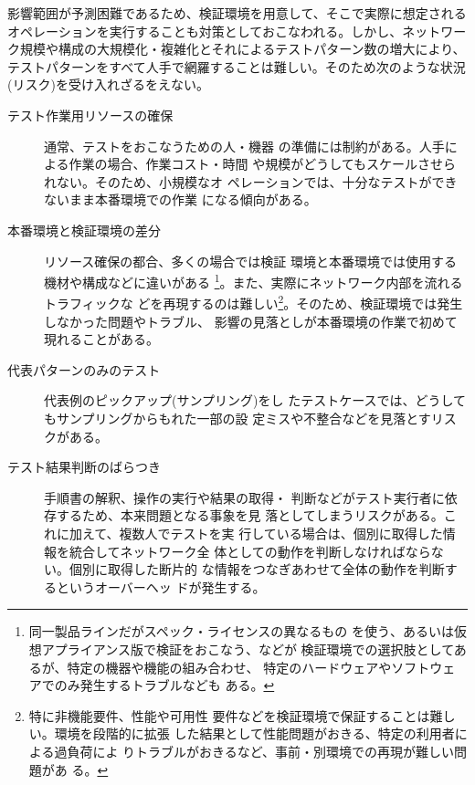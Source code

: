 影響範囲が予測困難であるため、検証環境を用意して、そこで実際に想定される
オペレーションを実行することも対策としておこなわれる。しかし、ネットワー
ク規模や構成の大規模化・複雑化とそれによるテストパターン数の増大により、
テストパターンをすべて人手で網羅することは難しい。そのため次のような状況
(リスク)を受け入れざるをえない。
\begin{description}
 \item[テスト作業用リソースの確保] 通常、テストをおこなうための人・機器
            の準備には制約がある。人手による作業の場合、作業コスト・時間
            や規模がどうしてもスケールさせられない。そのため、小規模なオ
            ペレーションでは、十分なテストができないまま本番環境での作業
            になる傾向がある。
 \item[本番環境と検証環境の差分] リソース確保の都合、多くの場合では検証
            環境と本番環境では使用する機材や構成などに違いがある
            \footnote{同一製品ラインだがスペック・ライセンスの異なるもの
            を使う、あるいは仮想アプライアンス版で検証をおこなう、などが
            検証環境での選択肢としてあるが、特定の機器や機能の組み合わせ、
            特定のハードウェアやソフトウェアでのみ発生するトラブルなども
            ある。}。また、実際にネットワーク内部を流れるトラフィックな
            どを再現するのは難しい\footnote{特に非機能要件、性能や可用性
            要件などを検証環境で保証することは難しい。環境を段階的に拡張
            した結果として性能問題がおきる、特定の利用者による過負荷によ
            りトラブルがおきるなど、事前・別環境での再現が難しい問題があ
            る。}。そのため、検証環境では発生しなかった問題やトラブル、
            影響の見落としが本番環境の作業で初めて現れることがある。
 \item[代表パターンのみのテスト] 代表例のピックアップ(サンプリング)をし
            たテストケースでは、どうしてもサンプリングからもれた一部の設
            定ミスや不整合などを見落とすリスクがある。
 \item[テスト結果判断のばらつき] 手順書の解釈、操作の実行や結果の取得・
            判断などがテスト実行者に依存するため、本来問題となる事象を見
            落としてしまうリスクがある。これに加えて、複数人でテストを実
            行している場合は、個別に取得した情報を統合してネットワーク全
            体としての動作を判断しなければならない。個別に取得した断片的
            な情報をつなぎあわせて全体の動作を判断するというオーバーヘッ
            ドが発生する。
\end{description}

